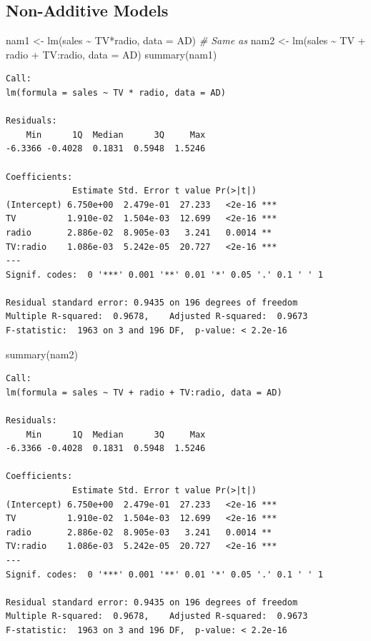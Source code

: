 \documentclass[
]{article}
\newenvironment{Shaded}{\begin{snugshade}}{\end{snugshade}}
\newcommand{\AttributeTok}[1]{\textcolor[rgb]{0.77,0.63,0.00}{#1}}
\newcommand{\CommentTok}[1]{\textcolor[rgb]{0.56,0.35,0.01}{\textit{#1}}}
\newcommand{\FunctionTok}[1]{\textcolor[rgb]{0.00,0.00,0.00}{#1}}
\newcommand{\NormalTok}[1]{#1}
\newcommand{\OtherTok}[1]{\textcolor[rgb]{0.56,0.35,0.01}{#1}}
\newcommand{\SpecialCharTok}[1]{\textcolor[rgb]{0.00,0.00,0.00}{#1}}
\begin{document}
\hypertarget{non-additive-models}{%
\subsection{Non-Additive Models}\label{non-additive-models}}

\begin{Shaded}
\begin{Highlighting}[]
\NormalTok{nam1 }\OtherTok{\textless{}{-}} \FunctionTok{lm}\NormalTok{(sales }\SpecialCharTok{\textasciitilde{}}\NormalTok{ TV}\SpecialCharTok{*}\NormalTok{radio, }\AttributeTok{data =}\NormalTok{ AD)}
\CommentTok{\# Same as }
\NormalTok{nam2 }\OtherTok{\textless{}{-}} \FunctionTok{lm}\NormalTok{(sales }\SpecialCharTok{\textasciitilde{}}\NormalTok{ TV }\SpecialCharTok{+}\NormalTok{ radio }\SpecialCharTok{+}\NormalTok{ TV}\SpecialCharTok{:}\NormalTok{radio, }\AttributeTok{data =}\NormalTok{ AD)}
\FunctionTok{summary}\NormalTok{(nam1)}
\end{Highlighting}
\end{Shaded}

\begin{verbatim}
Call:
lm(formula = sales ~ TV * radio, data = AD)

Residuals:
    Min      1Q  Median      3Q     Max 
-6.3366 -0.4028  0.1831  0.5948  1.5246 

Coefficients:
             Estimate Std. Error t value Pr(>|t|)    
(Intercept) 6.750e+00  2.479e-01  27.233   <2e-16 ***
TV          1.910e-02  1.504e-03  12.699   <2e-16 ***
radio       2.886e-02  8.905e-03   3.241   0.0014 ** 
TV:radio    1.086e-03  5.242e-05  20.727   <2e-16 ***
---
Signif. codes:  0 '***' 0.001 '**' 0.01 '*' 0.05 '.' 0.1 ' ' 1

Residual standard error: 0.9435 on 196 degrees of freedom
Multiple R-squared:  0.9678,    Adjusted R-squared:  0.9673 
F-statistic:  1963 on 3 and 196 DF,  p-value: < 2.2e-16
\end{verbatim}

\begin{Shaded}
\begin{Highlighting}[]
\FunctionTok{summary}\NormalTok{(nam2)}
\end{Highlighting}
\end{Shaded}

\begin{verbatim}
Call:
lm(formula = sales ~ TV + radio + TV:radio, data = AD)

Residuals:
    Min      1Q  Median      3Q     Max 
-6.3366 -0.4028  0.1831  0.5948  1.5246 

Coefficients:
             Estimate Std. Error t value Pr(>|t|)    
(Intercept) 6.750e+00  2.479e-01  27.233   <2e-16 ***
TV          1.910e-02  1.504e-03  12.699   <2e-16 ***
radio       2.886e-02  8.905e-03   3.241   0.0014 ** 
TV:radio    1.086e-03  5.242e-05  20.727   <2e-16 ***
---
Signif. codes:  0 '***' 0.001 '**' 0.01 '*' 0.05 '.' 0.1 ' ' 1

Residual standard error: 0.9435 on 196 degrees of freedom
Multiple R-squared:  0.9678,    Adjusted R-squared:  0.9673 
F-statistic:  1963 on 3 and 196 DF,  p-value: < 2.2e-16
\end{verbatim}
\end{document}
